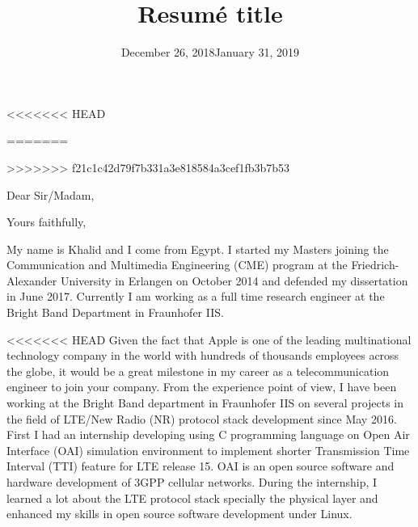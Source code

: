 \documentclass[11pt,a4paper,sans]{moderncv}        %
\title{Resumé title}                               %
\begin{document}
<<<<<<< HEAD
\date{December 26, 2018}
=======
\date{January 31, 2019}
>>>>>>> f21c1c42d79f7b331a3e818584a3cef1fb3b7b53
\opening{Dear Sir/Madam,}
\closing{Yours faithfully,}
\makelettertitle

My name is Khalid and I come from Egypt. I started my Masters joining the Communication and Multimedia Engineering (CME) program at the Friedrich-Alexander University in Erlangen on October 2014 and defended my dissertation in June 2017. Currently I am working as a full time research engineer at the Bright Band Department in Fraunhofer IIS.

<<<<<<< HEAD
Given the fact that Apple is one of the leading multinational technology company in the world with hundreds of thousands employees across the globe, it would be a great milestone in my career as a telecommunication engineer to join your company. From the experience point of view, I have been working at the Bright Band department in Fraunhofer IIS on several projects in the field of LTE/New Radio (NR) protocol stack development since May 2016. First I had an internship developing using C programming language on Open Air Interface (OAI) simulation environment to implement shorter Transmission Time Interval (TTI) feature for LTE release 15. OAI is an open source software and hardware development of 3GPP cellular networks. During the internship, I learned a lot about the LTE protocol stack specially the physical layer and enhanced my skills in open source software development under Linux. 
\end{document}
